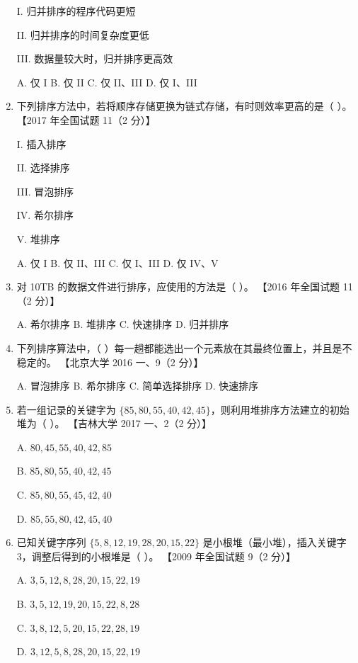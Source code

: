 \documentclass[lang=cn,newtx,10pt,scheme=chinese]{elegantbook}
\begin{document}
\begin{enumerate}
    I. 归并排序的程序代码更短  

    II. 归并排序的时间复杂度更低  

    III. 数据量较大时，归并排序更高效 

    A. 仅 I \quad B. 仅 II \quad C. 仅 II、III \quad D. 仅 I、III  

    \item 下列排序方法中，若将顺序存储更换为链式存储，有时则效率更高的是（ ）。  
    【2017 年全国试题 11（2 分）】  

    I. 插入排序  

    II. 选择排序  

    III. 冒泡排序  

    IV. 希尔排序  

    V. 堆排序  

    A. 仅 I \quad B. 仅 II、III \quad C. 仅 I、III \quad D. 仅 IV、V  

    \item 对 10TB 的数据文件进行排序，应使用的方法是（ ）。  
    【2016 年全国试题 11（2 分）】  

    A. 希尔排序 \quad B. 堆排序 \quad C. 快速排序 \quad D. 归并排序  

    \item 下列排序算法中，（ ）每一趟都能选出一个元素放在其最终位置上，并且是不稳定的。  
    【北京大学 2016 一、9（2 分）】  

    A. 冒泡排序 \quad B. 希尔排序 \quad C. 简单选择排序 \quad D. 快速排序  

    \item 若一组记录的关键字为 $\{85, 80, 55, 40, 42, 45\}$，则利用堆排序方法建立的初始堆为（ ）。  
    【吉林大学 2017 一、2（2 分）】  

    A. $80, 45, 55, 40, 42, 85$  

    B. $85, 80, 55, 40, 42, 45$  

    C. $85, 80, 55, 45, 42, 40$  

    D. $85, 55, 80, 42, 45, 40$  

    \item 已知关键字序列 $\{5, 8, 12, 19, 28, 20, 15, 22\}$ 是小根堆（最小堆），插入关键字 3，调整后得到的小根堆是（ ）。  
    【2009 年全国试题 9（2 分）】  

    A. $3, 5, 12, 8, 28, 20, 15, 22, 19$  

    B. $3, 5, 12, 19, 20, 15, 22, 8, 28$  

    C. $3, 8, 12, 5, 20, 15, 22, 28, 19$  

    D. $3, 12, 5, 8, 28, 20, 15, 22, 19$  


\end{enumerate}
\end{document}
